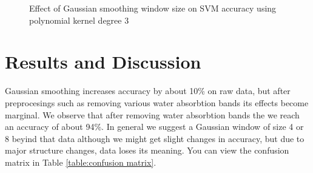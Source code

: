 \documentclass[remotesensing,article,accept,moreauthors,pdftex,12pt,a4paper]{mdpi}
\begin{document}
\begin{figure}[htp]
  \centering
  \hspace{1em}%
   \caption{Effect of Gaussian smoothing window size on SVM accuracy using polynomial kernel degree 3}
 \label{fig:gaussian smoothing}
\end{figure}


\section{Results and Discussion}

Gaussian smoothing increases accuracy by about 10\% on raw data, but after preprocesings such as removing various water absorbtion bands its effects become marginal. We observe that after removing water absorbtion bands the we reach an accuracy of about 94\%. In general we suggest a Gaussian window of size 4 or 8 beyind that data although we might get slight changes in accuracy, but due to major structure changes, data loses its meaning. You can view the confusion matrix in Table \ref{table:confusion matrix}. 
\end{document}

